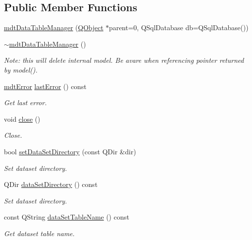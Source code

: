 \subsection*{Public Member Functions}
\begin{DoxyCompactItemize}
\item 
\hyperlink{classmdt_data_table_manager_ae63e559f597ae48a36e149afde3a8396}{mdt\-Data\-Table\-Manager} (\hyperlink{class_q_object}{Q\-Object} $\ast$parent=0, Q\-Sql\-Database db=Q\-Sql\-Database())
\item 
\hyperlink{classmdt_data_table_manager_a3a1c225b1aeedad8fc89b126147971ca}{$\sim$mdt\-Data\-Table\-Manager} ()
\begin{DoxyCompactList}\small\item\em Note\-: this will delete internal model. Be avare when referencing pointer returned by model(). \end{DoxyCompactList}\item 
\hyperlink{classmdt_error}{mdt\-Error} \hyperlink{classmdt_data_table_manager_aaeff001bf9a44f890078f5c6f434ec05}{last\-Error} () const 
\begin{DoxyCompactList}\small\item\em Get last error. \end{DoxyCompactList}\item 
void \hyperlink{classmdt_data_table_manager_a368e82d3128e0c5098e09a9555bd65aa}{close} ()
\begin{DoxyCompactList}\small\item\em Close. \end{DoxyCompactList}\item 
bool \hyperlink{classmdt_data_table_manager_a1e19b3f34c1b0a91bcae4396731efc57}{set\-Data\-Set\-Directory} (const Q\-Dir \&dir)
\begin{DoxyCompactList}\small\item\em Set dataset directory. \end{DoxyCompactList}\item 
Q\-Dir \hyperlink{classmdt_data_table_manager_a8fa0924a76e8f3fec9617f690cc4e148}{data\-Set\-Directory} () const 
\begin{DoxyCompactList}\small\item\em Set dataset directory. \end{DoxyCompactList}\item 
const Q\-String \hyperlink{classmdt_data_table_manager_affcbb25ab7308527885c4f3f703e7440}{data\-Set\-Table\-Name} () const 
\begin{DoxyCompactList}\small\item\em Get dataset table name. \end{DoxyCompactList}\item 

\end{DoxyCompactItemize}
